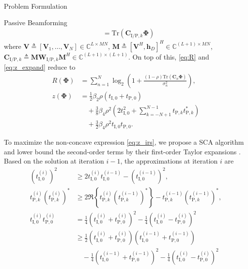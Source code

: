 \documentclass[journal]{IEEEtran}
\begin{document}
\begin{section}{Problem Formulation}
\begin{subsection}{Passive Beamforming}
\begin{align}
				& = \mathrm{Tr}(\boldsymbol{C}_{\mathrm{I/P},k}\boldsymbol{\Phi})\label{eq:t_k}
			\end{align}
			where $\boldsymbol{V} \triangleq [\boldsymbol{V}_1,\dots,\boldsymbol{V}_N] \in \mathbb{C}^{L \times MN}$, $\boldsymbol{M} \triangleq [\boldsymbol{V}^H, \boldsymbol{h}_{D}]^H \in \mathbb{C}^{(L+1) \times MN}$, $\boldsymbol{C}_{\mathrm{I/P},k} \triangleq \boldsymbol{M}\boldsymbol{W}_{\mathrm{I/P},k}\boldsymbol{M}^H \in \mathbb{C}^{(L+1)\times(L+1)}$. On top of this, \eqref{eq:R} and \eqref{eq:z_expand} reduce to
			\begin{align}
				R(\boldsymbol{\Phi})
				& = \sum_{n=1}^{N}{\log_2\left(1+\frac{(1-\rho)\mathrm{Tr}(\boldsymbol{C}_n\boldsymbol{\Phi})}{\sigma_n^2}\right)},\label{eq:R_irs}\\
				z(\boldsymbol{\Phi})
				& = \frac{1}{2}{\beta_2}{\rho}(t_{\mathrm{I},0}+t_{\mathrm{P},0})\nonumber\\
				& \quad + \frac{3}{8}{\beta_4}{\rho^2} \left(2t_{\mathrm{I},0}^2 + \sum_{k=-N+1}^{N-1}{t_{\mathrm{P},k}t_{\mathrm{P},k}^*}\right)\nonumber\\
				& \quad + \frac{3}{2}{\beta_4}{\rho^2}t_{\mathrm{I},0}t_{\mathrm{P},0}.\label{eq:z_irs}
			\end{align}

			To maximize the non-concave expression \eqref{eq:z_irs}, we propose a SCA algorithm and lower bound the second-order terms by their first-order Taylor expansions \cite{Adali2010}. Based on the solution at iteration $i - 1$, the approximations at iteration $i$ are
			\begin{align}
				(t_{\mathrm{I},0}^{(i)})^2
				& \ge 2 t_{\mathrm{I},0}^{(i)}t_{\mathrm{I},0}^{(i-1)} - (t_{\mathrm{I},0}^{(i-1)})^2,\label{eq:taylor_1}\\
				t_{\mathrm{P},k}^{(i)} (t_{\mathrm{P},k}^{(i)})^*
				& \ge 2 \Re\left\{t_{\mathrm{P},k}^{(i)} (t_{\mathrm{P},k}^{(i-1)})^*\right\} - t_{\mathrm{P},k}^{(i-1)} (t_{\mathrm{P},k}^{(i-1)})^*,\label{eq:taylor_2}\\
				t_{\mathrm{I},0}^{(i)} t_{\mathrm{P},0}^{(i)}
				& = \frac{1}{4}(t_{\mathrm{I},0}^{(i)} + t_{\mathrm{P},0}^{(i)})^2 - \frac{1}{4}(t_{\mathrm{I},0}^{(i)} - t_{\mathrm{P},0}^{(i)})^2\nonumber\\
				& \ge \frac{1}{2}(t_{\mathrm{I},0}^{(i)} + t_{\mathrm{P},0}^{(i)})(t_{\mathrm{I},0}^{(i-1)} + t_{\mathrm{P},0}^{(i-1)})\nonumber\\
				& \quad - \frac{1}{4}(t_{\mathrm{I},0}^{(i-1)} + t_{\mathrm{P},0}^{(i-1)})^2 - \frac{1}{4}(t_{\mathrm{I},0}^{(i)} - t_{\mathrm{P},0}^{(i)})^2\label{eq:taylor_3}
			\end{align}


\end{subsection}
\end{section}
\end{document}
